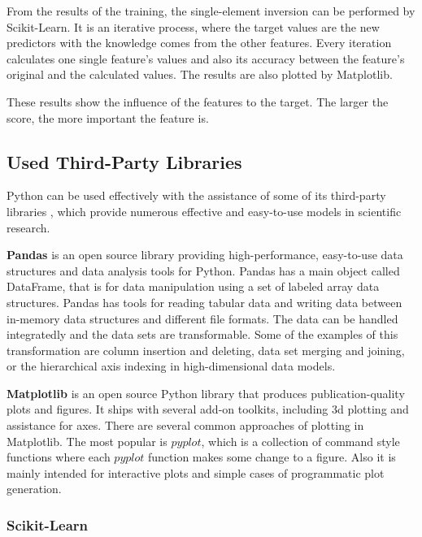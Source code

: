 From the results of the training, the single-element inversion can be performed by Scikit-Learn. It is an iterative process, where the target values are the new predictors with the knowledge comes from the other features. Every iteration calculates one single feature's values and also its accuracy between the feature's original and the calculated values. The results are also plotted by Matplotlib. \smallskip

These results show the influence of the features to the target. The larger the score, the more important the feature is.



\subsection{Used Third-Party Libraries}

Python can be used effectively with the assistance of some of its third-party libraries \cite{g2015learning} \cite{bressert2012scipy}, which provide numerous effective and easy-to-use models in scientific research. \medskip

\textbf{Pandas} \cite{chen2017pandas} is an open source library providing high-performance, easy-to-use data structures and data analysis tools for Python. Pandas has a main object called DataFrame, that is for data manipulation using a set of labeled array data structures. Pandas has tools for reading tabular data and writing data between in-memory data structures and different file formats. The data can be handled integratedly and the data sets are transformable. Some of the examples of this transformation are column insertion and deleting, data set merging and joining, or the hierarchical axis indexing in high-dimensional data models.\bigskip


\textbf{Matplotlib} is an open source Python library that produces publication-quality plots and figures. It ships with several add-on toolkits, including 3d plotting and assistance for axes. There are several common approaches of plotting in Matplotlib. The most popular is $pyplot$, which is a collection of command style functions where each $pyplot$ function makes some change to a figure. Also it is mainly intended for interactive plots and simple cases of programmatic plot generation.


\subsubsection{Scikit-Learn}

